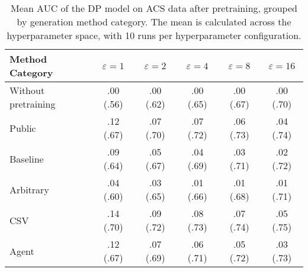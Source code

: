 \begin{table}[h!]
    \centering
    \caption{Mean AUC of the DP model on ACS data after pretraining, grouped by generation method category. The mean is calculated across the hyperparameter space, with 10 runs per hyperparameter configuration.}
    \label{tab:epsilon_comparison}
    \begin{tabular}{lccccc}
    \toprule
    Method Category & $\varepsilon=1$ & $\varepsilon=2$ & $\varepsilon=4$ & $\varepsilon=8$ & $\varepsilon=16$ \\
    \midrule
    Without pretraining & .00 {\small (.56)} & .00 {\small (.62)} & .00 {\small (.65)} & .00 {\small (.67)} & .00 {\small (.70)} \\
    \arrayrulecolor{black!50!}\midrule
    Public & \cellcolor{silver!30}.12 {\small (.67)} & \cellcolor{silver!30}.07 {\small (.70)} & \cellcolor{silver!30}.07 {\small (.72)} & \cellcolor{silver!30}.06 {\small (.73)} & \cellcolor{silver!30}.04 {\small (.74)} \\
    \arrayrulecolor{black!50!}\midrule
    Baseline & .09 {\small (.64)} & .05 {\small (.67)} & .04 {\small (.69)} & .03 {\small (.71)} & .02 {\small (.72)} \\
    \arrayrulecolor{black!50!}\midrule
    Arbitrary & .04 {\small (.60)} & .03 {\small (.65)} & .01 {\small (.66)} & .01 {\small (.68)} & .01 {\small (.71)} \\
    \arrayrulecolor{black!50!}\midrule
    CSV & \cellcolor{gold!30}.14 {\small (.70)} & \cellcolor{gold!30}.09 {\small (.72)} & \cellcolor{gold!30}.08 {\small (.73)} & \cellcolor{gold!30}.07 {\small (.74)} & \cellcolor{gold!30}.05 {\small (.75)} \\
    Agent & \cellcolor{bronze!30}.12 {\small (.67)} & \cellcolor{bronze!30}.07 {\small (.69)} & \cellcolor{bronze!30}.06 {\small (.71)} & \cellcolor{bronze!30}.05 {\small (.72)} & \cellcolor{bronze!30}.03 {\small (.73)} \\
    \bottomrule
    \end{tabular}
\end{table}